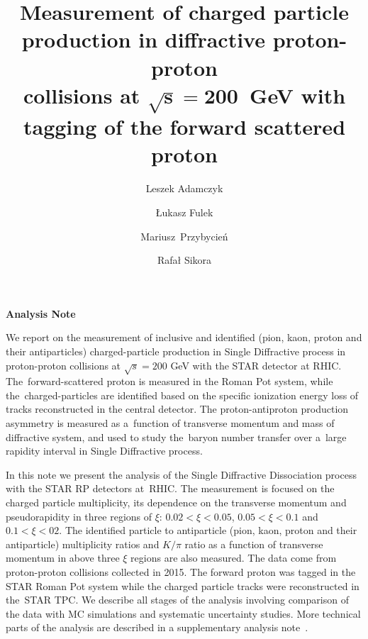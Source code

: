 \documentclass[a4paper,10pt,notitlepage]{report}
\title{\textbf{Measurement of charged particle production in diffractive proton-proton\\ collisions at $\mathbf{\sqrt{s}=200}$~GeV with tagging of the forward scattered proton}\vspace*{10pt}}
\author[1]{Leszek Adamczyk}
\author[1]{Łukasz Fulek}
\author[1]{\mbox{Mariusz Przybycień}}
\author[1]{Rafał Sikora}
\affil[1]{AGH University of Science and Technology, FPACS, Kraków, Poland}
\begin{document}
\makeatletter
\setlength{\@fptop}{0pt}
\makeatother

\begin{center}
	\textbf{\LARGE{Analysis Note}}
	
	\begin{minipage}{\linewidth}
		\maketitle
		We report on the measurement of inclusive and identified (pion, kaon, proton and their antiparticles) charged-particle production in Single Diffractive process in proton-proton collisions  at $\sqrt{s}= 200$ GeV with the STAR detector at RHIC. The~forward-scattered proton is measured in the Roman Pot system, while the~charged-particles are identified based on the specific ionization energy loss of tracks reconstructed in the central detector. The proton-antiproton production asymmetry is measured as a~function of transverse momentum and mass of diffractive system, and used to study the~baryon number transfer over a~large rapidity interval in Single Diffractive process. 
		
		
			In this note we present the analysis of the Single Diffractive Dissociation process with the STAR \ac{RP} detectors at~RHIC. The measurement is focused on the charged particle
			multiplicity, its dependence on the transverse momentum  and pseudorapidity   in  three regions of $\xi$: $0.02<\xi <0.05$, $0.05<\xi<0.1$ and $0.1<\xi<02$.  The identified particle to antiparticle (pion, kaon, proton and their antiparticle) multiplicity ratios and $K/\pi$ ratio as a function of transverse momentum in above three $\xi$ regions  are also measured. 
			The data come from proton-proton collisions collected in 2015. The forward proton was tagged in the STAR Roman Pot system while the charged particle tracks were reconstructed in the~STAR \ac{TPC}. 
			We describe all stages of the analysis involving comparison of the data with MC simulations and systematic uncertainty studies.
			More technical parts of the analysis  are described in a supplementary analysis note~\cite{supplementaryNote}.	
		\thispagestyle{empty}
	\end{minipage}

\end{center}


\newpage


\end{document}
